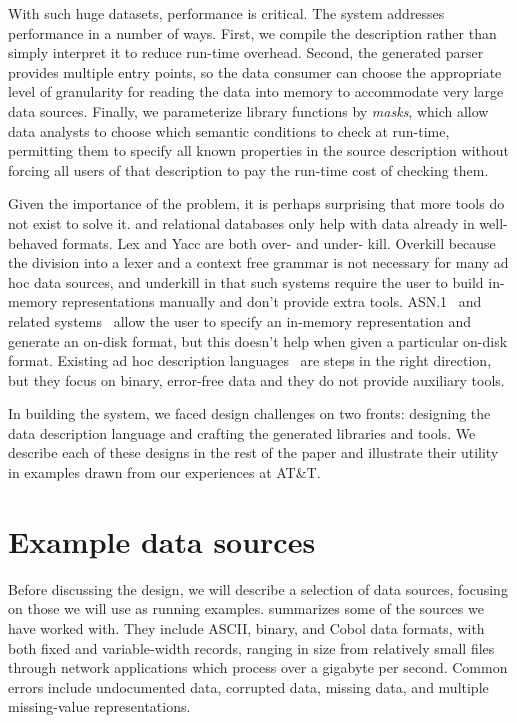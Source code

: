 \documentclass{sig-alternate}
\begin{document}
With such huge datasets, performance is critical. The \pads{} system addresses performance in a number of ways.
First, we compile the \pads{} description rather than simply interpret it to reduce run-time overhead.
Second, the generated parser provides  multiple entry points, so the data consumer can choose 
the appropriate level of granularity for reading the data into memory to accommodate very large data sources.
Finally, we parameterize library functions by \textit{masks}, which allow data analysts to 
choose which semantic conditions to check at run-time, permitting them to specify
all known properties in the source description without forcing all users of that 
description to pay the run-time cost of checking them.  

Given the importance of the problem, it is perhaps surprising
that more tools do not exist to solve it.  \xml{} and relational databases
only help with data already in well-behaved formats.  Lex and Yacc are both
over- and under- kill.  Overkill  because the division into a lexer and a context free grammar is not necessary for many ad hoc data sources, and underkill in that such systems require the user to build in-memory representations manually and don't provide extra tools.  ASN.1~\cite{asn} and related systems~\cite{asdl} allow the user to specify an in-memory representation and generate an on-disk format, but this doesn't help when given a particular on-disk format.  
Existing ad hoc description languages~\cite{gpce02,sigcomm00,erlang} are steps 
in the right direction, but they focus on binary, error-free data and they do not provide auxiliary tools.

In building the \pads{} system, we faced design challenges on two fronts:
designing the data description language and
crafting the generated libraries and tools.
We describe each of these designs in the rest of the paper
and illustrate their utility in examples drawn
from our experiences at AT\&T. 

\section{Example data sources}

Before discussing the \pads{} design, we will describe a selection of data
sources, focusing on those we will use as running examples.
 summarizes some of the sources we have
worked with.  They include ASCII, binary, and Cobol data formats, with
both fixed and variable-width records, ranging in size from
relatively small files through network applications which process over
a gigabyte per second.  Common errors include undocumented data,
corrupted data, missing data, and multiple missing-value
representations.
\end{document}
